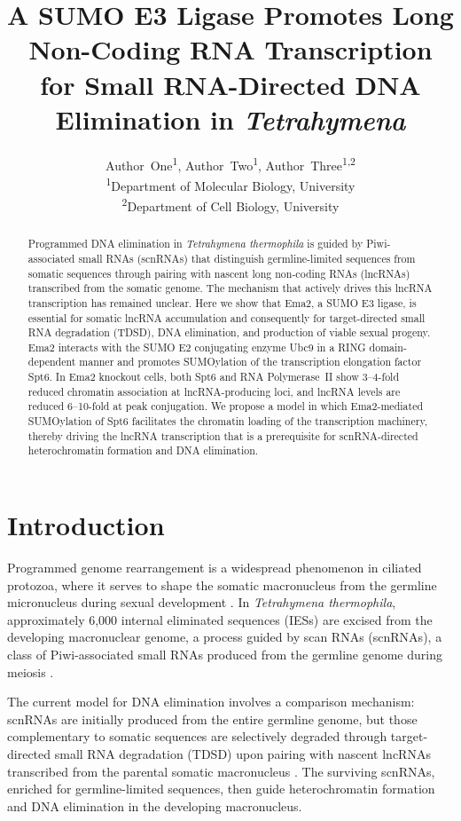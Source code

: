 \documentclass[11pt]{article}
\title{A SUMO E3 Ligase Promotes Long Non-Coding RNA Transcription for Small RNA-Directed DNA Elimination in \textit{Tetrahymena}}
\author{
  Author~One\textsuperscript{1},
  Author~Two\textsuperscript{1},
  Author~Three\textsuperscript{1,2} \\
  \textsuperscript{1}Department of Molecular Biology, University \\
  \textsuperscript{2}Department of Cell Biology, University
}
\date{}
\begin{document}
\maketitle

\begin{abstract}
Programmed DNA elimination in \textit{Tetrahymena thermophila} is guided by Piwi-associated small RNAs (scnRNAs) that distinguish germline-limited sequences from somatic sequences through pairing with nascent long non-coding RNAs (lncRNAs) transcribed from the somatic genome. The mechanism that actively drives this lncRNA transcription has remained unclear. Here we show that Ema2, a SUMO E3 ligase, is essential for somatic lncRNA accumulation and consequently for target-directed small RNA degradation (TDSD), DNA elimination, and production of viable sexual progeny. Ema2 interacts with the SUMO E2 conjugating enzyme Ubc9 in a RING domain-dependent manner and promotes SUMOylation of the transcription elongation factor Spt6. In Ema2 knockout cells, both Spt6 and RNA Polymerase~II show 3--4-fold reduced chromatin association at lncRNA-producing loci, and lncRNA levels are reduced 6--10-fold at peak conjugation. We propose a model in which Ema2-mediated SUMOylation of Spt6 facilitates the chromatin loading of the transcription machinery, thereby driving the lncRNA transcription that is a prerequisite for scnRNA-directed heterochromatin formation and DNA elimination.
\end{abstract}

\section{Introduction}

Programmed genome rearrangement is a widespread phenomenon in ciliated protozoa, where it serves to shape the somatic macronucleus from the germline micronucleus during sexual development \citep{chalker2011,mochizuki2012}. In \textit{Tetrahymena thermophila}, approximately 6,000 internal eliminated sequences (IESs) are excised from the developing macronuclear genome, a process guided by scan RNAs (scnRNAs), a class of Piwi-associated small RNAs produced from the germline genome during meiosis \citep{mochizuki2002}.

The current model for DNA elimination involves a comparison mechanism: scnRNAs are initially produced from the entire germline genome, but those complementary to somatic sequences are selectively degraded through target-directed small RNA degradation (TDSD) upon pairing with nascent lncRNAs transcribed from the parental somatic macronucleus \citep{aronica2008,noto2015}. The surviving scnRNAs, enriched for germline-limited sequences, then guide heterochromatin formation and DNA elimination in the developing macronucleus.
\end{document}
